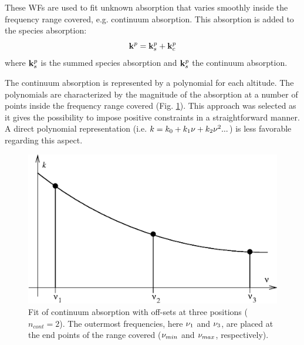  \label{sec:wfuns:cont}

 These WFs are used to fit unknown absorption that varies smoothly inside
 the frequency range covered, e.g. continuum absorption. This absorption
 is added to the species absorption:
 \begin{equation}
   \mathbf{k}^p = \mathbf{k}^p_s + \mathbf{k}^p_c
 \end{equation}
 where $\mathbf{k}^p_s$ is the summed species absorption and $\mathbf{k}^p_s$
 the continuum absorption.
 
 The continuum absorption is represented by a polynomial for each
 altitude. The polynomials are characterized by the magnitude of the
 absorption at a number of points inside the frequency range covered
 (Fig. \ref{fig:wfuns:cont}). This approach was selected as it gives
 the possibility to impose positive constraints in a straightforward
 manner. A direct polynomial representation (i.e.
 $k=k_0+k_1\nu+k_2\nu^2...$) is less favorable regarding this aspect.
 
 \begin{figure}[t]
  \begin{center}
   \includegraphics*[width=0.95\hsize]{Figs/contfit.eps}
   \caption{Fit of continuum absorption with off-sets at three 
            positions ($n_{cont}=2$). The outermost frequencies, here 
            $\nu_1$ and $\nu_3$, are placed at the end points of the 
            range covered ($\nu_{min}$ and $\nu_{max}$, respectively).}
   \label{fig:wfuns:cont}  
  \end{center}
 \end{figure}

